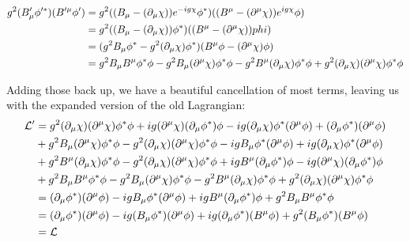 \begin{align*}
    g^2(B'_\mu\phi'^*) (B'^\mu \phi') &= g^2((B_\mu - (\partial_\mu \chi))e^{-ig\chi}\phi^*) ((B^\mu - (\partial^\mu \chi)) e^{ig\chi}\phi) \\
    &= g^2((B_\mu - (\partial_\mu \chi))\phi^*) ((B^\mu - (\partial^\mu \chi))phi) \\
    &= (g^2B_\mu\phi^* - g^2(\partial_\mu \chi)\phi^*) (B^\mu \phi - (\partial^\mu \chi)\phi) \\
    &= g^2B_\mu B^\mu \phi^*\phi - g^2B_\mu(\partial^\mu \chi)\phi^*\phi - g^2B^\mu(\partial_\mu \chi)\phi^*\phi + g^2(\partial_\mu \chi)(\partial^\mu \chi)\phi^*\phi \\
\end{align*}

\newpage
Adding those back up, we have a beautiful cancellation of most terms, leaving us with the expanded version of the old Lagrangian:
\begin{align*}
    \mathcal{L}' &= g^2(\partial_\mu\chi)(\partial^\mu \chi) \phi^* \phi + ig(\partial^\mu \chi)(\partial_\mu \phi^*) \phi -ig(\partial_\mu\chi)\phi^*(\partial^\mu \phi) +(\partial_\mu \phi^*)(\partial^\mu \phi) \\
    &+ g^2 B_\mu (\partial^\mu \chi)\phi^*\phi - g^2(\partial_\mu \chi)(\partial^\mu \chi)\phi^*\phi - ig B_\mu \phi^*(\partial^\mu\phi) + ig(\partial_\mu \chi)\phi^*(\partial^\mu\phi) \\
    &+ g^2B^\mu(\partial_\mu \chi)\phi^*\phi - g^2(\partial_\mu \chi)(\partial^\mu \chi)\phi^*\phi + igB^\mu(\partial_\mu \phi^*)\phi - ig(\partial^\mu \chi)(\partial_\mu \phi^*)\phi \\
    &+ g^2B_\mu B^\mu \phi^*\phi - g^2B_\mu(\partial^\mu \chi)\phi^*\phi - g^2B^\mu(\partial_\mu \chi)\phi^*\phi + g^2(\partial_\mu \chi)(\partial^\mu \chi)\phi^*\phi \\
    &= (\partial_\mu\phi^*)(\partial^\mu\phi) - igB_\mu\phi^*(\partial^\mu\phi) + igB^\mu(\partial_\mu\phi^*)\phi + g^2B_\mu B^\mu\phi^*\phi \\
    &= (\partial_\mu\phi^*)(\partial^\mu\phi) - ig (B_\mu\phi^*) (\partial^\mu\phi) + ig(\partial_\mu\phi^*)(B^\mu\phi) + g^2(B_\mu\phi^*) (B^\mu\phi) \\
    &= \mathcal{L} \\
\end{align*}

